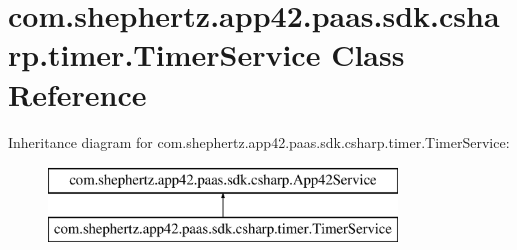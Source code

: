 \hypertarget{classcom_1_1shephertz_1_1app42_1_1paas_1_1sdk_1_1csharp_1_1timer_1_1_timer_service}{\section{com.\+shephertz.\+app42.\+paas.\+sdk.\+csharp.\+timer.\+Timer\+Service Class Reference}
\label{classcom_1_1shephertz_1_1app42_1_1paas_1_1sdk_1_1csharp_1_1timer_1_1_timer_service}
}
Inheritance diagram for com.\+shephertz.\+app42.\+paas.\+sdk.\+csharp.\+timer.\+Timer\+Service\+:\begin{figure}[H]
\begin{center}
\leavevmode
\includegraphics[height=2.000000cm]{classcom_1_1shephertz_1_1app42_1_1paas_1_1sdk_1_1csharp_1_1timer_1_1_timer_service}
\end{center}
\end{figure}
